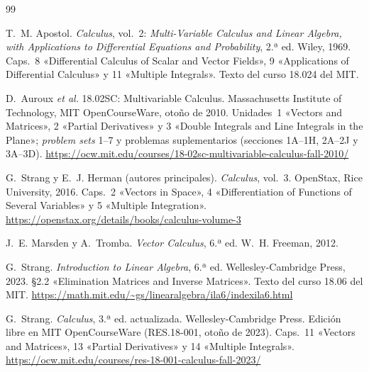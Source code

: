 \begin{thebibliography}{99}
\small

T.~M. Apostol.
\newblock \emph{Calculus}, vol.~2: \emph{Multi-Variable Calculus and Linear Algebra, with Applications to Differential Equations and Probability}, 2.ª ed.
\newblock Wiley, 1969.
\newblock Caps.~8 «Differential Calculus of Scalar and Vector Fields», 9 «Applications of Differential Calculus» y 11 «Multiple Integrals». Texto del curso 18.024 del MIT.

D.~Auroux \emph{et al.}
\newblock 18.02SC: Multivariable Calculus.
\newblock Massachusetts Institute of Technology, MIT OpenCourseWare, otoño de 2010.
\newblock Unidades~1 «Vectors and Matrices», 2 «Partial Derivatives» y 3 «Double Integrals and Line Integrals in the Plane»; \emph{problem sets} 1--7 y problemas suplementarios (secciones 1A--1H, 2A--2J y 3A--3D).
\newblock \url{https://ocw.mit.edu/courses/18-02sc-multivariable-calculus-fall-2010/}

G.~Strang y E.~J. Herman (autores principales).
\newblock \emph{Calculus}, vol.~3.
\newblock OpenStax, Rice University, 2016.
\newblock Caps.~2 «Vectors in Space», 4 «Differentiation of Functions of Several Variables» y 5 «Multiple Integration».
\newblock \url{https://openstax.org/details/books/calculus-volume-3}

J.~E. Marsden y A.~Tromba.
\newblock \emph{Vector Calculus}, 6.ª ed.
\newblock W.~H. Freeman, 2012.

G.~Strang.
\newblock \emph{Introduction to Linear Algebra}, 6.ª ed.
\newblock Wellesley-Cambridge Press, 2023.
\newblock §2.2 «Elimination Matrices and Inverse Matrices». Texto del curso 18.06 del MIT.
\newblock \url{https://math.mit.edu/~gs/linearalgebra/ila6/indexila6.html}

G.~Strang.
\newblock \emph{Calculus}, 3.ª ed. actualizada.
\newblock Wellesley-Cambridge Press. Edición libre en MIT OpenCourseWare (RES.18-001, otoño de 2023).
\newblock Caps.~11 «Vectors and Matrices», 13 «Partial Derivatives» y 14 «Multiple Integrals».
\newblock \url{https://ocw.mit.edu/courses/res-18-001-calculus-fall-2023/}

\end{thebibliography}
